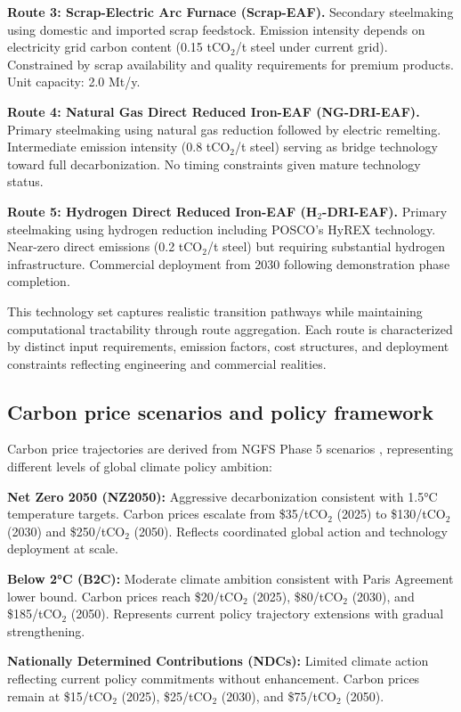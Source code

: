 \documentclass[preprint,5p,authoryear]{elsarticle}
\begin{document}
\textbf{Route 3: Scrap-Electric Arc Furnace (Scrap-EAF).} Secondary steelmaking using domestic and imported scrap feedstock. Emission intensity depends on electricity grid carbon content (0.15 tCO$_2$/t steel under current grid). Constrained by scrap availability and quality requirements for premium products. Unit capacity: 2.0 Mt/y.

\textbf{Route 4: Natural Gas Direct Reduced Iron-EAF (NG-DRI-EAF).} Primary steelmaking using natural gas reduction followed by electric remelting. Intermediate emission intensity (0.8 tCO$_2$/t steel) serving as bridge technology toward full decarbonization. No timing constraints given mature technology status.

\textbf{Route 5: Hydrogen Direct Reduced Iron-EAF (H$_2$-DRI-EAF).} Primary steelmaking using hydrogen reduction including POSCO's HyREX technology. Near-zero direct emissions (0.2 tCO$_2$/t steel) but requiring substantial hydrogen infrastructure. Commercial deployment from 2030 following demonstration phase completion.

This technology set captures realistic transition pathways while maintaining computational tractability through route aggregation. Each route is characterized by distinct input requirements, emission factors, cost structures, and deployment constraints reflecting engineering and commercial realities.

\subsection{Carbon price scenarios and policy framework}

Carbon price trajectories are derived from NGFS Phase 5 scenarios \citep{NGFS2024}, representing different levels of global climate policy ambition:

\textbf{Net Zero 2050 (NZ2050):} Aggressive decarbonization consistent with 1.5°C temperature targets. Carbon prices escalate from \$35/tCO$_2$ (2025) to \$130/tCO$_2$ (2030) and \$250/tCO$_2$ (2050). Reflects coordinated global action and technology deployment at scale.

\textbf{Below 2°C (B2C):} Moderate climate ambition consistent with Paris Agreement lower bound. Carbon prices reach \$20/tCO$_2$ (2025), \$80/tCO$_2$ (2030), and \$185/tCO$_2$ (2050). Represents current policy trajectory extensions with gradual strengthening.

\textbf{Nationally Determined Contributions (NDCs):} Limited climate action reflecting current policy commitments without enhancement. Carbon prices remain at \$15/tCO$_2$ (2025), \$25/tCO$_2$ (2030), and \$75/tCO$_2$ (2050).
\end{document}
